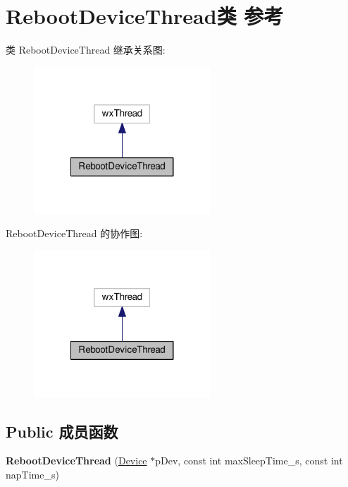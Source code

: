 \hypertarget{class_reboot_device_thread}{\section{Reboot\+Device\+Thread类 参考}
\label{class_reboot_device_thread}
}


类 Reboot\+Device\+Thread 继承关系图\+:
\nopagebreak
\begin{figure}[H]
\begin{center}
\leavevmode
\includegraphics[width=188pt]{class_reboot_device_thread__inherit__graph}
\end{center}
\end{figure}


Reboot\+Device\+Thread 的协作图\+:
\nopagebreak
\begin{figure}[H]
\begin{center}
\leavevmode
\includegraphics[width=188pt]{class_reboot_device_thread__coll__graph}
\end{center}
\end{figure}
\subsection*{Public 成员函数}
\begin{DoxyCompactItemize}
\item 
\hypertarget{class_reboot_device_thread_a42139f0e89f9f6b4b6a8f6ca761be7c4}{{\bfseries Reboot\+Device\+Thread} (\hyperlink{classmv_i_m_p_a_c_t_1_1acquire_1_1_device}{Device} $\ast$p\+Dev, const int max\+Sleep\+Time\+\_\+s, const int nap\+Time\+\_\+s)}\label{class_reboot_device_thread_a42139f0e89f9f6b4b6a8f6ca761be7c4}

\end{DoxyCompactItemize}

